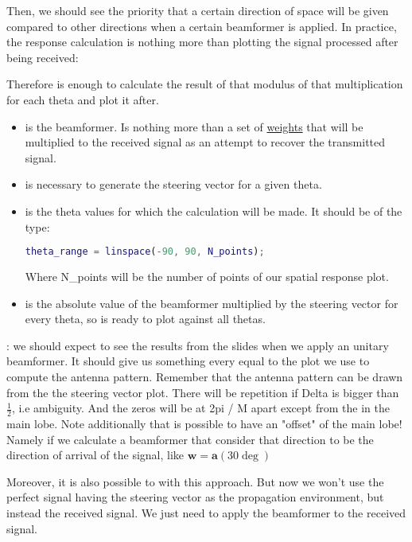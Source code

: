 \documentclass[12pt, a4paper]{article}
\begin{document}
\vspace{1cm}

\par Then, we should see the priority that a certain direction of space will be given compared to other directions when a certain beamformer is applied. In practice, the response calculation is nothing more than plotting the signal processed after being received: 


\par Therefore is enough to calculate the result of that modulus of that multiplication for each theta and plot it after.


\begin{itemize}
    \item {} is the beamformer. Is nothing more than a set of \uline{weights} that will be multiplied to the received signal as an attempt to recover the transmitted signal.
    \item {} is necessary to generate the steering vector for a given theta.
    \item {} is the theta values for which the calculation will be made. It should be of the type:
    \begin{lstlisting}[language=matlab]
        theta_range = linspace(-90, 90, N_points);
    \end{lstlisting}
    Where N\_points will be the number of points of our spatial response plot.
    \item {} is the absolute value of the beamformer multiplied by the steering vector for every theta, so is ready to plot against all thetas.
\end{itemize}

: we should expect to see the results from the slides when we apply an unitary beamformer. It should give us something every equal to the plot we use to compute the antenna pattern. Remember that the antenna pattern can be drawn from the the steering vector plot. There will be repetition if Delta is bigger than $\frac{1}{2}$, i.e ambiguity.
And the zeros will be at 2pi / M apart except from the in the main lobe. 
Note additionally that is possible to have an "offset" of the main lobe! Namely if we calculate a beamformer that consider that direction to be the direction of arrival of the signal, like $\mathbf{w} = \mathbf{a}(30\deg)$
\par Moreover, it is also possible to  with this approach. But now we won't use the perfect signal having the steering vector as the propagation environment, but instead the received signal. We just need to apply the beamformer to the received signal. 
\end{document}
